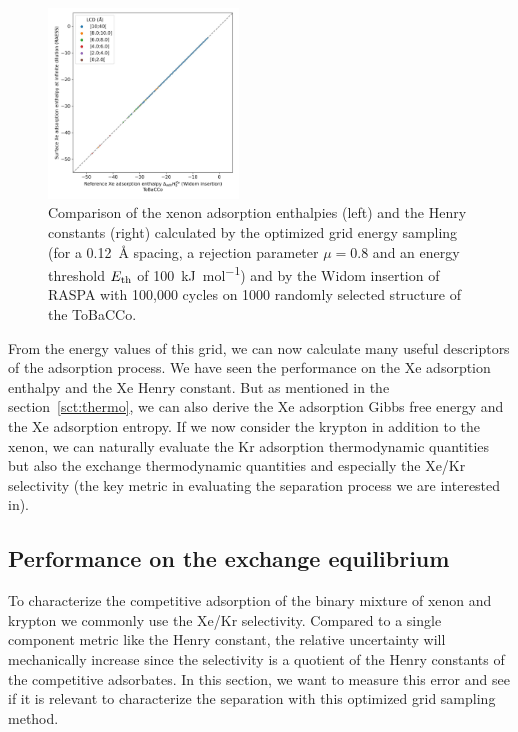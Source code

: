 \documentclass[main]{subfiles}
\begin{document}
\begin{figure}[ht]
  \centering
    \includegraphics[width=0.45\textwidth]{figures/3-fastsim/H_Xe_0_widom_vs_Enthalpy_grid_kjmol_overview_tobacco.jpeg}
    \caption{Comparison of the xenon adsorption enthalpies (left) and the Henry constants (right) calculated by the optimized grid energy sampling (for a \SI{0.12}{\angstrom} spacing, a rejection parameter $\mu=0.8$ and an energy threshold $E_{\text{th}}$ of \SI{100}{\kilo\joule\per\mole}) and by the Widom insertion of RASPA with 100,000 cycles on 1000 randomly selected structure of the ToBaCCo.\autocite{Colon_2017} }\label{fgr:grid_tobacco}
\end{figure}

From the energy values of this grid, we can now calculate many useful descriptors of the adsorption process. We have seen the performance on the Xe adsorption enthalpy and the Xe Henry constant. But as mentioned in the section~\ref{sct:thermo}, we can also derive the Xe adsorption Gibbs free energy and the Xe adsorption entropy. If we now consider the krypton in addition to the xenon, we can naturally evaluate the Kr adsorption thermodynamic quantities but also the exchange thermodynamic quantities and especially the Xe/Kr selectivity (the key metric in evaluating the separation process we are interested in).


\subsection{Performance on the exchange equilibrium}

To characterize the competitive adsorption of the binary mixture of xenon and krypton we commonly use the Xe/Kr selectivity. Compared to a single component metric like the Henry constant, the relative uncertainty will mechanically increase since the selectivity is a quotient of the Henry constants of the competitive adsorbates. In this section, we want to measure this error and see if it is relevant to characterize the separation with this optimized grid sampling method.
\end{document}
